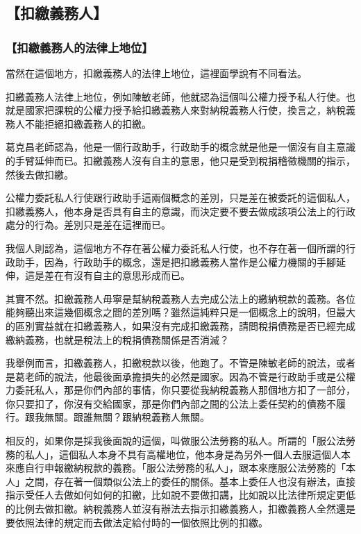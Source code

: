 \documentclass[oneside,sub3section]{ctexbook}
\begin{document}
\hypertarget{ux6263ux7e73ux7fa9ux52d9ux4eba-1}{%
\subsection{【扣繳義務人】}\label{ux6263ux7e73ux7fa9ux52d9ux4eba-1}}

\hypertarget{ux6263ux7e73ux7fa9ux52d9ux4ebaux7684ux6cd5ux5f8bux4e0aux5730ux4f4d}{%
\subsubsection{【扣繳義務人的法律上地位】}\label{ux6263ux7e73ux7fa9ux52d9ux4ebaux7684ux6cd5ux5f8bux4e0aux5730ux4f4d}}

當然在這個地方，扣繳義務人的法律上地位，這裡面學說有不同看法。

扣繳義務人法律上地位，例如陳敏老師，他就認為這個叫公權力授予私人行使。也就是國家把課稅的公權力授予給扣繳義務人來對納稅義務人行使，換言之，納稅義務人不能拒絕扣繳義務人的扣繳。

葛克昌老師認為，他是一個行政助手，行政助手的概念就是他是一個沒有自主意識的手臂延伸而已。扣繳義務人沒有自主的意思，他只是受到稅捐稽徵機關的指示，然後去做扣繳。

公權力委託私人行使跟行政助手這兩個概念的差別，只是差在被委託的這個私人，扣繳義務人，他本身是否具有自主的意識，而決定要不要去做成該項公法上的行政處分的行為。差別只是差在這裡而已。

我個人則認為，這個地方不存在著公權力委託私人行使，也不存在著一個所謂的行政助手，因為，行政助手的概念，還是把扣繳義務人當作是公權力機關的手腳延伸，這是差在有沒有自主的意思形成而已。

其實不然。扣繳義務人毋寧是幫納稅義務人去完成公法上的繳納稅款的義務。各位能夠聽出來這幾個概念之間的差別嗎？雖然這純粹只是一個概念上的說明，但最大的區別實益就在扣繳義務人，如果沒有完成扣繳義務，請問稅捐債務是否已經完成繳納義務，也就是稅法上的稅捐債務關係是否消滅？

我舉例而言，扣繳義務人，扣繳稅款以後，他跑了。不管是陳敏老師的說法，或者是葛老師的說法，他最後面承擔損失的必然是國家。因為不管是行政助手或是公權力委託私人，那是你們內部的事情，你只要從我納稅義務人那個地方扣了一部分，你只要扣了，你沒有交給國家，那是你們內部之間的公法上委任契約的債務不履行。跟我無關。跟誰無關？跟納稅義務人無關。

相反的，如果你是採我後面說的這個，叫做服公法勞務的私人。所謂的「服公法勞務的私人」，這個私人本身不具有高權地位，他本身是為另外一個人去服這個人本來應自行申報繳納稅款的義務。「服公法勞務的私人」，跟本來應服公法勞務的「本人」之間，存在著一個類似公法上的委任的關係。基本上委任人也沒有辦法，直接指示受任人去做如何如何的扣繳，比如說不要做扣講，比如說以比法律所規定更低的比例去做扣繳。納稅義務人並沒有辦法去指示扣繳義務人，扣繳義務人全然還是要依照法律的規定而去做法定給付時的一個依照比例的扣繳。
\end{document}
